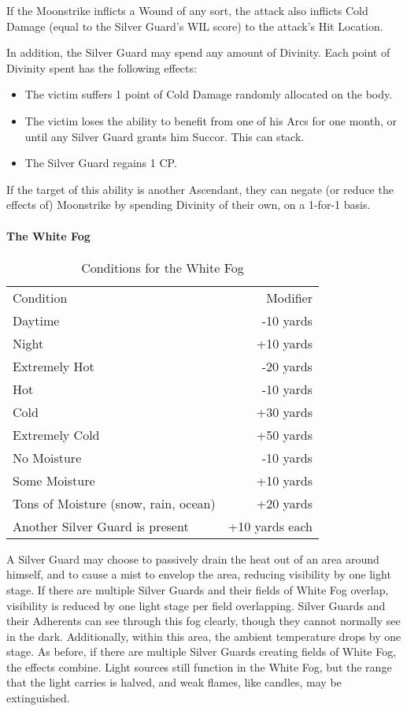 \documentclass[oneside,11pt,english]{book}
\begin{document}
If the Moonstrike inflicts a Wound of any sort, the attack also inflicts Cold Damage (equal to the 
Silver Guard's WIL score) to the attack’s Hit Location. 


In addition, the Silver Guard may spend any amount of Divinity. Each point of Divinity spent has 
the following effects: 
\begin{itemize}
\item The victim suffers 1 point of Cold Damage randomly allocated on the body. 
\item The victim loses the ability to benefit from one of his Arcs for one month, or until any 
Silver Guard grants him Succor. This can stack. 
\item The Silver Guard regains 1 CP. 
\end{itemize}
If the target of this ability is another Ascendant, they can negate (or reduce the effects of) Moonstrike by spending Divinity of their own, on a 1-for-1 basis. 
\paragraph{The White Fog} %
\begin{wraptable}{r}{9 cm}
	\caption{Conditions for the White Fog}
	\label{tab:Dessian White Fog}
	\begin{tabu} spread 0pt {Xr}
		Condition&Modifier\\
		Daytime&-10 yards\\
		Night&+10 yards\\
		Extremely Hot&-20 yards \\
		Hot&-10 yards \\
		Cold&+30 yards \\
		Extremely Cold&+50 yards \\
		No Moisture&-10 yards \\
		Some Moisture&+10 yards \\
		Tons of Moisture (snow, rain, ocean)&+20 yards \\
		Another Silver Guard is present&+10 yards each \\
	\end{tabu}
\end{wraptable}
A Silver Guard may choose to passively drain the heat out of an area around himself, and to cause 
a mist to envelop the area, reducing visibility by one light stage. If there are multiple Silver 
Guards and their fields of White Fog overlap, visibility is reduced by one light stage per field 
overlapping. Silver Guards and their Adherents can see through this fog clearly, though they 
cannot normally see in the dark. Additionally, within this area, the ambient temperature drops by 
one stage. As before, if there are multiple Silver Guards creating fields of White Fog, the effects 
combine. Light sources still function in the White Fog, but the range that the light carries is 
halved, and weak flames, like candles, may be extinguished. 
\end{document}
